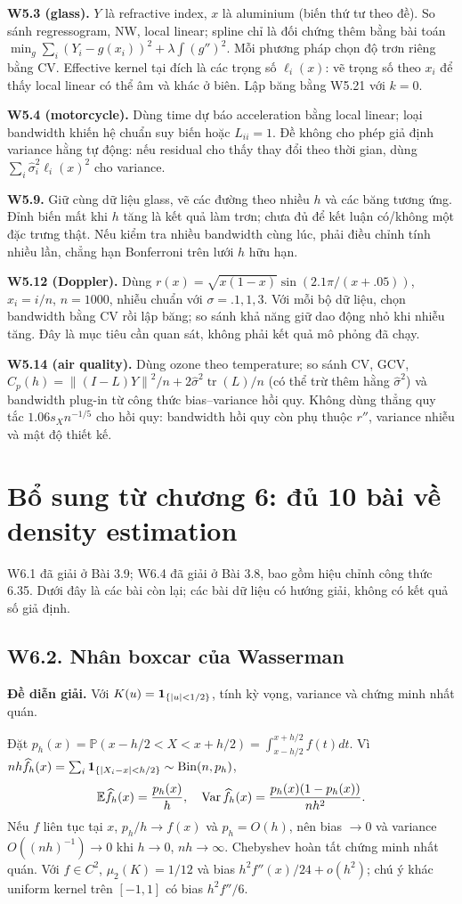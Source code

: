 \documentclass[11pt,a4paper]{article}
\newcommand{\E}{\mathbb E}\newcommand{\Pp}{\mathbb P}
\DeclareMathOperator{\Var}{Var}\DeclareMathOperator{\Cov}{Cov}
\DeclareMathOperator{\tr}{tr}\DeclareMathOperator{\se}{se}
\newcommand{\norm}[1]{\left\lVert#1\right\rVert}
\newcommand{\supp}[3]{\subsection{#1. #2}\label{s:#1}\textbf{Đề diễn giải.} #3\par}
\begin{document}
\textbf{W5.3 (glass).} $Y$ là refractive index, $x$ là aluminium (biến thứ tư theo đề). So sánh regressogram, NW, local linear; spline chỉ là đối chứng thêm bằng bài toán $\min_g\sum_i(Y_i-g(x_i))^2+\lambda\int(g'')^2$. Mỗi phương pháp chọn độ trơn riêng bằng CV. Effective kernel tại đích là các trọng số $\ell_i(x)$: vẽ trọng số theo $x_i$ để thấy local linear có thể âm và khác ở biên. Lập băng bằng W5.21 với $k=0$.

\textbf{W5.4 (motorcycle).} Dùng time dự báo acceleration bằng local linear; loại bandwidth khiến hệ chuẩn suy biến hoặc $L_{ii}=1$. Đề không cho phép giả định variance hằng tự động: nếu residual cho thấy thay đổi theo thời gian, dùng $\sum_i\widehat\sigma_i^2\ell_i(x)^2$ cho variance.

\textbf{W5.9.} Giữ cùng dữ liệu glass, vẽ các đường theo nhiều $h$ và các băng tương ứng. Đỉnh biến mất khi $h$ tăng là kết quả làm trơn; chưa đủ để kết luận có/không một đặc trưng thật. Nếu kiểm tra nhiều bandwidth cùng lúc, phải điều chỉnh tính nhiều lần, chẳng hạn Bonferroni trên lưới $h$ hữu hạn.

\textbf{W5.12 (Doppler).} Dùng $r(x)=\sqrt{x(1-x)}\sin(2.1\pi/(x+.05))$, $x_i=i/n$, $n=1000$, nhiễu chuẩn với $\sigma=.1,1,3$. Với mỗi bộ dữ liệu, chọn bandwidth bằng CV rồi lập băng; so sánh khả năng giữ dao động nhỏ khi nhiễu tăng. Đây là mục tiêu cần quan sát, không phải kết quả mô phỏng đã chạy.

\textbf{W5.14 (air quality).} Dùng ozone theo temperature; so sánh CV, GCV,
$C_p(h)=\norm{(I-L)Y}^2/n+2\widehat\sigma^2\tr(L)/n$ (có thể trừ thêm hằng $\widehat\sigma^2$) và bandwidth plug-in từ công thức bias--variance hồi quy. Không dùng thẳng quy tắc $1.06s_X n^{-1/5}$ cho hồi quy: bandwidth hồi quy còn phụ thuộc $r''$, variance nhiễu và mật độ thiết kế.
\section{Bổ sung từ chương 6: đủ 10 bài về density estimation}
W6.1 đã giải ở Bài 3.9; W6.4 đã giải ở Bài 3.8, bao gồm hiệu chỉnh công thức 6.35. Dưới đây là các bài còn lại; các bài dữ liệu có hướng giải, không có kết quả số giả định.

\supp{W6.2}{Nhân boxcar của Wasserman}{Với $K(u)=\mathbf 1_{\{|u|<1/2\}}$, tính kỳ vọng, variance và chứng minh nhất quán.}
Đặt $p_h(x)=\Pp(x-h/2<X<x+h/2)=\int_{x-h/2}^{x+h/2}f(t)dt$.
Vì $nh\widehat f_h(x)=\sum_i\mathbf 1_{\{|X_i-x|<h/2\}}\sim\operatorname{Bin}(n,p_h)$,
\[
\E\fh(x)=\frac{p_h(x)}h,\quad
\Var\fh(x)=\frac{p_h(x)(1-p_h(x))}{nh^2}.
\]
Nếu $f$ liên tục tại $x$, $p_h/h\to f(x)$ và $p_h=O(h)$, nên bias $\to0$ và variance $O((nh)^{-1})\to0$ khi $h\to0$, $nh\to\infty$.
Chebyshev hoàn tất chứng minh nhất quán. Với $f\in C^2$,
$\mu_2(K)=1/12$ và bias $h^2f''(x)/24+o(h^2)$; chú ý khác uniform kernel trên $[-1,1]$ có bias $h^2f''/6$.
\end{document}
